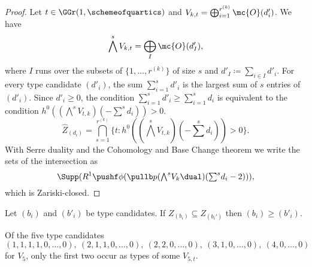 \begin{proof}
Let $t\in \GGr(1,\schemeofquartics)$ and $V_{k,t} = \bigoplus_{i=1}^{r^{(k)}} \mc{O}(d'_i)$. We have
\[
\bigwedge^s V_{k,t} = \bigoplus_{I} \mc{O}(d_I'),
\]
where $I$ runs over the subsets of $\{1,\dotsc, r^{(k)}\}$ of size $s$ and $d'_I\coloneqq \sum_{i\in I} d'_i$.
For every type candidate $(d'_i)$, the sum $\sum_{i=1}^s d'_i$ is the largest sum of $s$ entries of $(d'_i)$. Since $d'_i \geq 0$, the condition $\sum_{i=1}^s d'_i \geq \sum_{i=1}^s d_i$ is equivalent to the condition $h^0((\textstyle{\bigwedge}^{s} V_{t,k})(-\textstyle{\sum}^s d_i)) > 0$.
\[
	\widehat Z_{(d_i)} = \bigcap_{s=1}^{r^{(k)}} \{t : h^0((\textstyle{\bigwedge}^{s} V_{t,k})(-\textstyle{\sum}^s d_i)) > 0\}.
\]
With Serre duality and the Cohomology and Base Change theorem we write the sets of the intersection as 
\[
	\Supp(R^1 \pushf \phi (\pullb p (\textstyle{\bigwedge}^{s} V_k\dual )(\textstyle{\sum}^s d_i - 2))),
\]
which is Zariski-closed.
\end{proof}

\begin{corollary}
	Let $(b_i)$ and $(b'_i)$ be type candidates. If $Z_{(b_i)} \subseteq Z_{(b_i')}$ then $(b_i) \geq (b'_i)$.
\end{corollary}

\begin{proposition}
Of the five type candidates
\[
(1,1,1,1,0,\dotsc,0),\ (2,1,1,0,\dotsc,0),\ (2,2,0,\dotsc,0),\ (3,1,0,\dotsc,0),\ (4,0,\dotsc,0)
\]
for $V_5$, only the first two occur as types of some $V_{5,t}$.
\end{proposition}

